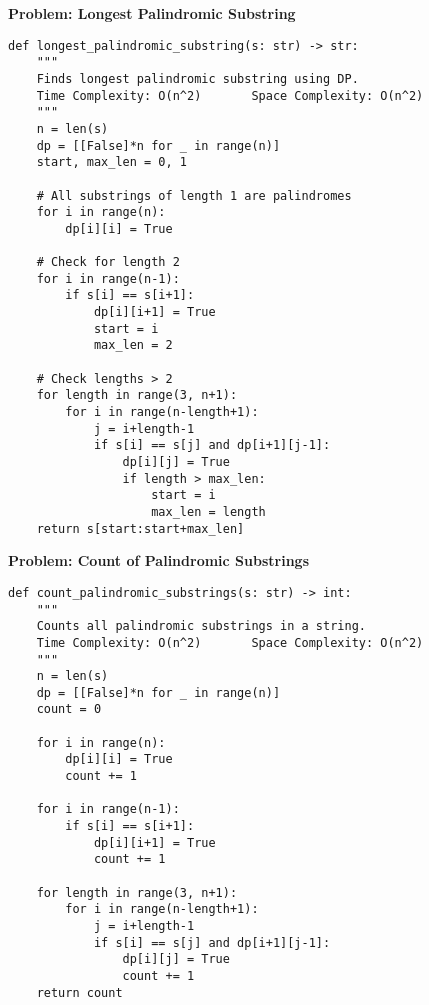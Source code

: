 \noindent\textbf{Problem: Longest Palindromic Substring}
\begin{verbatim}
def longest_palindromic_substring(s: str) -> str:
    """
    Finds longest palindromic substring using DP.
    Time Complexity: O(n^2)       Space Complexity: O(n^2)
    """
    n = len(s)
    dp = [[False]*n for _ in range(n)]
    start, max_len = 0, 1
    
    # All substrings of length 1 are palindromes
    for i in range(n):
        dp[i][i] = True
    
    # Check for length 2
    for i in range(n-1):
        if s[i] == s[i+1]:
            dp[i][i+1] = True
            start = i
            max_len = 2
    
    # Check lengths > 2
    for length in range(3, n+1):
        for i in range(n-length+1):
            j = i+length-1
            if s[i] == s[j] and dp[i+1][j-1]:
                dp[i][j] = True
                if length > max_len:
                    start = i
                    max_len = length
    return s[start:start+max_len]
\end{verbatim}

\noindent\textbf{Problem: Count of Palindromic Substrings}
\begin{verbatim}
def count_palindromic_substrings(s: str) -> int:
    """
    Counts all palindromic substrings in a string.
    Time Complexity: O(n^2)       Space Complexity: O(n^2)
    """
    n = len(s)
    dp = [[False]*n for _ in range(n)]
    count = 0
    
    for i in range(n):
        dp[i][i] = True
        count += 1
    
    for i in range(n-1):
        if s[i] == s[i+1]:
            dp[i][i+1] = True
            count += 1
    
    for length in range(3, n+1):
        for i in range(n-length+1):
            j = i+length-1
            if s[i] == s[j] and dp[i+1][j-1]:
                dp[i][j] = True
                count += 1
    return count
\end{verbatim}

